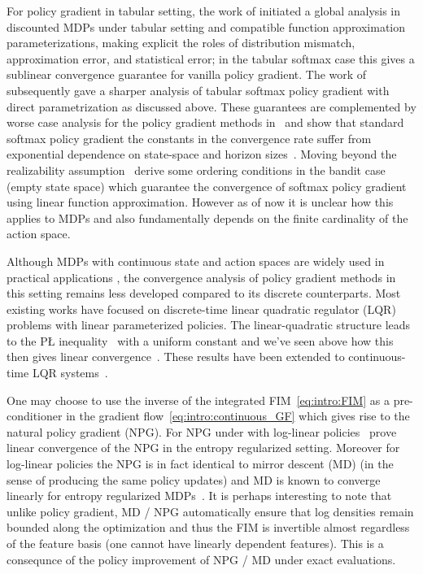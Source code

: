 \documentclass{amsart}
\theoremstyle{definition}
\begin{document}
For policy gradient in tabular setting, the work of \cite{agarwal2020optimality} initiated a global analysis in discounted MDPs under tabular setting and compatible function approximation parameterizations, making explicit the roles of distribution mismatch, approximation error, and statistical error; in the tabular softmax case this gives a sublinear convergence guarantee for vanilla policy gradient. 
The work of \cite{mei2020global} subsequently gave a sharper analysis of tabular softmax policy gradient with direct parametrization as discussed above. 
These guarantees are complemented by worse case analysis for the policy gradient methods in~\cite{agarwal2020optimality, mei2020global} and show that standard softmax policy gradient the constants in the convergence rate suffer from exponential dependence on state-space and horizon sizes~\cite{li2021softmax}.
Moving beyond the realizability assumption~\cite{lin2025rethinking} derive some  ordering conditions in the bandit case (empty state space) which guarantee the convergence of softmax policy gradient using linear function approximation.
However as of now it is unclear how this applies to MDPs and also fundamentally depends on the finite cardinality of the action space.

Although MDPs with continuous state and action spaces are widely used in practical applications \cite{doya2000reinforcement, van2012reinforcement, manna2022learning}, the convergence analysis of policy gradient methods in this setting remains less developed compared to its discrete counterparts.
Most existing works have focused on discrete-time linear quadratic regulator (LQR) problems with linear parameterized policies.
The linear-quadratic structure leads to the P{\L} inequality~\cite{polyak1963gradient, lojasiewicz1963topological, kurdyka1998gradients} with a uniform constant and we've seen above how this then gives linear convergence~\cite{fazel2018global, bu2019lqr, hu2023toward}.
These results have been extended to continuous-time LQR systems~\cite{sontag2022remarks,Giegrich2024}. 

One may choose to use the inverse of the integrated FIM~\eqref{eq:intro:FIM} as a pre-conditioner in the gradient flow~\eqref{eq:intro:continuous_GF} which gives rise to the natural policy gradient (NPG).  
For NPG under with log-linear policies~\cite{cayci2024convergence} prove linear convergence of the NPG in the entropy regularized setting.
Moreover for log-linear policies the NPG is in fact identical to mirror descent (MD) (in the sense of producing the same policy updates) and MD is known to converge linearly for entropy regularized MDPs~\cite{lan2023policy, ju2022policy, kerimkulov2025fisher}.
It is perhaps interesting to note that unlike policy gradient, MD / NPG automatically ensure that log densities remain bounded along the optimization and thus the FIM is invertible almost regardless of the feature basis (one cannot have linearly dependent features).
This is a consequnce of the policy improvement of NPG / MD under exact evaluations. 
\end{document}
